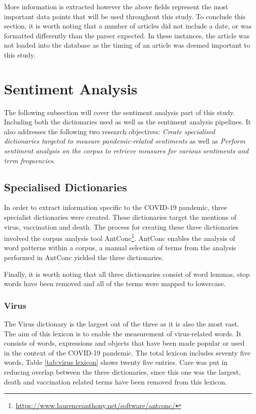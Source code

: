 More information is extracted however the above fields represent the most important data points that will be used throughout this study. To conclude this section, it is worth noting that a number of articles did not include a date, or was formatted differently than the parser expected. In these instances, the article was not loaded into the database as the timing of an article was deemed important to this study.

\section{Sentiment Analysis}

The following subsection will cover the sentiment analysis part of this study. Including both the dictionaries used as well as the sentiment analysis pipelines. It also addresses the following two research objectives: \emph{Create specialised dictionaries targeted to measure pandemic-related sentiments} as well as \emph{Perform sentiment analysis on the corpus to retrieve measures for various sentiments and term frequencies}.

\subsection{Specialised Dictionaries}\label{Custom Dicts}

In order to extract information specific to the COVID-19 pandemic, three specialist dictionaries were created. These dictionaries target the mentions of virus, vaccination and death. The process for creating these three dictionaries involved the corpus analysis tool AntConc\footnote{\url{https://www.laurenceanthony.net/software/antconc/}}. AntConc enables the analysis of word patterns within a corpus, a manual selection of terms from the analysis performed in AntConc yielded the three dictionaries.

Finally, it is worth noting that all three dictionaries consist of word lemmas, stop words have been removed and all of the terms were mapped to lowercase.

\subsubsection{Virus}

The Virus dictionary is the largest out of the three as it is also the most vast. The aim of this lexicon is to enable the measurement of virus-related words. It consists of words, expressions and objects that have been made popular or used in the context of the COVID-19 pandemic. The total lexicon includes seventy five words, Table \ref{tab:virus lexicon} shows twenty five entries. Care was put in reducing overlap between the three dictionaries, since this one was the largest, death and vaccination related terms have been removed from this lexicon.

